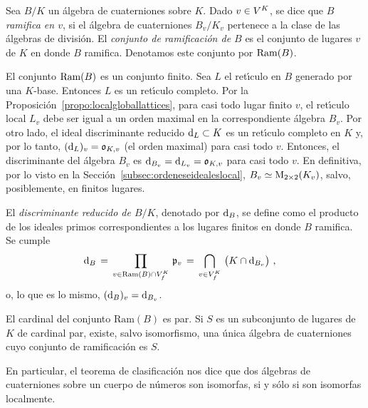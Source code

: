 Sea $B/K$ un \'{a}lgebra de cuaterniones sobre $K$. Dado $v\in\lugares{K}$, se
dice que \emph{$B$ ramifica en $v$}, si el \'{a}lgebra de cuaterniones
$B_{v}/K_{v}$ pertenece a la clase de las \'{a}lgebras de divisi\'{o}n. El
\emph{conjunto de ramificaci\'{o}n de $B$} es el conjunto de lugares $v$ de $K$
en donde $B$ ramifica. Denotamos este conjunto por $\Ram(B)$.

\begin{obsRamEsFinita}\label{obs:ramesfinita}
	El conjunto $\Ram(B)$ es un conjunto finito. Sea $L$ el ret\'{\i}culo
	en $B$ generado por una $K$-base. Entonces $L$ es un ret\'{\i}culo
	completo. Por la Proposici\'{o}n~\ref{propo:localgloballattices}, para
	casi todo lugar finito $v$, el ret\'{\i}culo local $L_{v}$ debe ser
	igual a un orden maximal en la correspondiente \'{a}lgebra $B_{v}$. Por
	otro lado, el ideal discriminante reducido $\drd{L}\subset K$ es un
	ret\'{\i}culo completo en $K$ y, por lo tanto,
	$(\drd{L})_{v}=\oka{K,v}$ (el orden maximal) para casi todo $v$.
	Entonces, el discriminante del \'{a}lgebra $B_{v}$ es
	$\drd{B_{v}}=\drd{L_{v}}=\oka{K,v}$ para casi todo $v$. En definitiva,
	por lo visto en la Secci\'{o}n~\ref{subsec:ordeneseidealeslocal},
	$B_{v}\simeq\MM_{2\times 2}(K_{v})$, salvo, posiblemente, en finitos
	lugares.
\end{obsRamEsFinita}

El \emph{discriminante reducido de $B/K$}, denotado por $\drd{B}$, se define
como el producto de los ideales primos correspondientes a los lugares finitos
en donde $B$ ramifica. Se cumple
\begin{align*}
	\drd{B} & \,=\,\prod_{v\in\Ram(B)\cap\lugares[f]{K}}\,\frak{p}_{v}
		\,=\,\bigcap_{v\in\lugares[f]{K}}\,\big(K\cap\drd{B_{v}}\big)
	\text{ ,}
\end{align*}
%
o, lo que es lo mismo, $(\drd{B})_{v}=\drd{B_{v}}$.

\begin{teoClassificationSurUnCorpsGlobal}%
	\label{thm:clasificacionglobal}
	El cardinal del conjunto $\mathrm{Ram}(B)$ es par. Si $S$ es un
	subconjunto de lugares de $K$ de cardinal par, existe, salvo
	isomorfismo, una \'{u}nica \'{a}lgebra de cuaterniones cuyo conjunto de
	ramificaci\'{o}n es $S$.
\end{teoClassificationSurUnCorpsGlobal}

En particular, el teorema de clasificaci\'{o}n nos dice que dos \'{a}lgebras de
cuaterniones sobre un cuerpo de n\'{u}meros son isomorfas, si y s\'{o}lo si son
isomorfas localmente.

